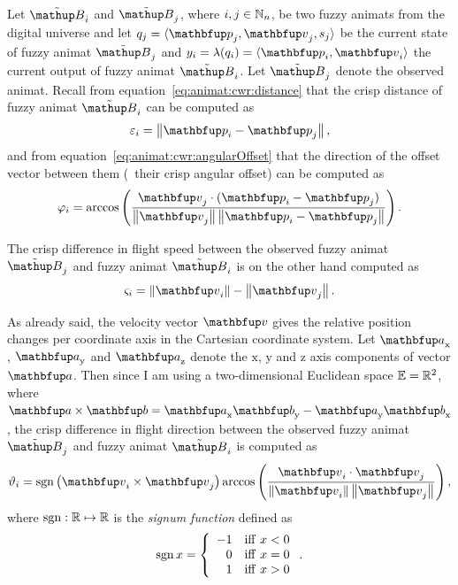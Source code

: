 Let $\fautom{B}_i$ and $\fautom{B}_j$, where $i, j \in \mathbb{N}_n$, be two fuzzy animats from the digital universe and let $q_j=\langle \vect{p}_j, \vect{v}_j, s_j \rangle$ be the current state of fuzzy animat $\fautom{B}_j$ and $y_i=\lambda(q_i)=\langle \vect{p}_i, \vect{v}_i \rangle$ the current output of fuzzy animat $\fautom{B}_i$. Let $\fautom{B}_j$ denote the observed animat. Recall from equation~\eqref{eq:animat:cwr:distance} that the crisp distance of fuzzy animat $\fautom{B}_i$ can be computed as
%
\begin{equation}
\varepsilon_i%
 =\left\|\vect{p}_i - \vect{p}_j\right\|,
\end{equation}
%
and from equation~\eqref{eq:animat:cwr:angularOffset} that the direction of the offset vector between them (\ie\ their crisp angular offset) can be computed as
%
\begin{equation}
\varphi_i%
 =\arccos \left( \frac {\vect{v}_j \cdot (\vect{p}_i - \vect{p}_j)}{\left\| \vect{v}_j \right\| \left\| \vect{p}_i - \vect{p}_j \right\|} \right). 
\end{equation}

The crisp difference in flight speed between the observed fuzzy animat $\fautom{B}_j$ and fuzzy animat $\fautom{B}_i$ is on the other hand computed as 
%
\begin{equation}
\varsigma_i%
 =\left\|\vect{v}_i\right\| - \left\|\vect{v}_j\right\|.
\end{equation}

As already said, the velocity vector $\vect{v}$ gives the relative position changes per coordinate axis in the Cartesian coordinate system. Let $\vect{a}_\textnormal{x}$, $\vect{a}_\textnormal{y}$ and $\vect{a}_\textnormal{z}$ denote the $\mathrm{x}$, $\mathrm{y}$ and $\mathrm{z}$ axis components of vector $\vect{a}$. Then since I am using a two-dimensional Euclidean space $\mathbb{E}=\mathbb{R}^2$, where $\vect{a} \times \vect{b} = \vect{a}_\textnormal{x}\vect{b}_\textnormal{y} - \vect{a}_\textnormal{y}\vect{b}_\textnormal{x}$, the crisp difference in flight direction between the observed fuzzy animat $\fautom{B}_j$ and fuzzy animat $\fautom{B}_i$ is computed as
%
\begin{equation}
\vartheta_i%
 =\sgn\left(\vect{v}_i \times \vect{v}_j\right)\arccos \left( \frac {\vect{v}_i \cdot \vect{v}_j}{\left\| \vect{v}_i \right\| \left\| \vect{v}_j \right\|} \right),
\end{equation}
%
where $\operatorname*{sgn}: \mathbb{R} \mapsto \mathbb{R}$ is the \emph{signum function} defined as 
\begin{equation}
\operatorname*{sgn} x=\left\{
\begin{array}{rl}
-1 & \mathrm{iff}\ x < 0\\
0 & \mathrm{iff}\ x = 0\\
1 & \mathrm{iff}\ x > 0
\end{array}
\right..
\end{equation}

